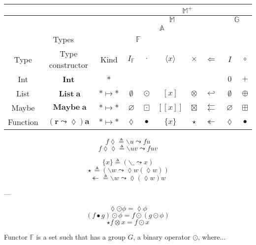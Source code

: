 \documentclass{jsarticle}
\def\[{[\![}
\def\]{]\!]}
\newcommand{\htypename}[1]{\mathbf{#1}}
\newcommand{\htypeclassname}[1]{\mathbb{#1}}
\newcommand{\identity}{I}
\newcommand{\binaryop}{\circ}
\newcommand{\inttypeconst}{\mathbf{Int}}
\newcommand{\listtype}[1]{[#1]}
\newcommand{\maybetype}[1]{\[#1\]}
\newcommand{\functype}[1]{\{#1\}}
\newcommand{\hrightarrow}{\leadsto}
\newcommand{\hlambdaparameter}{\lozenge}
\newcommand{\listtypeconst}[1]{\mathop{\htypename{List}}\htypename{#1}}
\newcommand{\maybetypeconst}[1]{\mathop{\htypename{Maybe}}\htypename{#1}}
\newcommand{\functypeconst}[1]{(\htypename{r}\hrightarrow\hlambdaparameter)\htypename{#1}}
\newcommand{\hfmap}{\cdot}
\newcommand{\hlistfmap}{\odot}
\newcommand{\hmaybefmap}{\boxdot}
\newcommand{\hfuncfmap}{\bullet}
\newcommand{\hemptylist}{\emptyset}
\newcommand{\hnothing}{\varnothing}
\newcommand{\hid}{\hlambdaparameter}
\newcommand{\hlambda}{\backslash}
\newcommand{\hlambdaparameterignore}{\_}
\newcommand{\hpure}[1]{\langle#1\rangle}
\newcommand{\hpurelist}[1]{\listtype{#1}}
\newcommand{\hpuremaybe}[1]{\maybetype{#1}}
\newcommand{\hpurefunc}[1]{\functype{#1}}
\newcommand{\hpurefuncimp}[1]{(\hlambda\hlambdaparameterignore\hrightarrow#1)}
\newcommand{\hafmap}{\times}
\newcommand{\hlistafmap}{\otimes}
\newcommand{\hmaybeafmap}{\boxtimes}
\newcommand{\hfuncafmap}{\star}
\newcommand{\hfuncafmapimp}[1]{(\hlambda#1\hrightarrow\hlambdaparameter#1(\hlambdaparameter#1))}
\newcommand{\hbind}{\Leftarrow}
\newcommand{\hlistbind}{\hookleftarrow}
\newcommand{\hmaybebind}{\leftleftarrows}
\newcommand{\hlistplus}{\oplus}
\newcommand{\hmaybeplus}{\boxplus}
\newcommand{\concretetype}{$\mathbf{*}$}
\newcommand{\functortype}{$\mathbf{*}\mapsto\mathbf{*}$}
\newcommand{\hmfbind}{\twoheadleftarrow}
\newcommand{\hmfbindimp}[1]{\hlambda#1\hrightarrow\hlambdaparameter(\hlambdaparameter#1)#1}
\begin{document}
\begin{center}
\begin{tabular}{||c|c|c||c|c|c|c|c|c|c||}
\hline
\multicolumn{3}{||c||}{ }
    &\multicolumn{7}{|c||}{$\htypeclassname{M}^+$}\\
\hline
\multicolumn{3}{||c||}{ }
    &\multicolumn{5}{|c|}{$\htypeclassname{M}$}
    &\multicolumn{2}{|c||}{$\htypeclassname{G}$}\\
\hline
\multicolumn{3}{||c||}{ }
    &\multicolumn{4}{|c|}{$\htypeclassname{A}$}
    &
    &\multicolumn{2}{|c||}{ }\\
\hline
\multicolumn{3}{||c||}{Types}
    &\multicolumn{2}{|c|}{$\htypeclassname{F}$}
    &\multicolumn{2}{|c|}{ }
    &
    &\multicolumn{2}{|c||}{ }\\
\hline
Type
    &Type constructor
    &Kind
    &$\identity_\htypeclassname{F}$
    &$\hfmap$
    &$\hpure{x}$
    &$\hafmap$
    &$\hbind$
    &$\identity$
    &$\binaryop$\\
\hline\hline
Int
    &$\inttypeconst$
    &\concretetype
    &
    &
    &
    &
    &
    &$0$
    &$+$\\
\hline
List
    &$\listtypeconst{a}$
    &\functortype
    &$\hemptylist$
    &$\hlistfmap$
    &$\hpurelist{x}$
    &$\hlistafmap$
    &$\hlistbind$
    &$\hemptylist$
    &$\hlistplus$\\
\hline
Maybe
    &$\maybetypeconst{a}$
    &\functortype
    &$\hnothing$
    &$\hmaybefmap$
    &$\hpuremaybe{x}$
    &$\hmaybeafmap$
    &$\hmaybebind$
    &$\hnothing$
    &$\hmaybeplus$\\
\hline
Function
    &$\functypeconst{a}$
    &\functortype
    &$\hid$
    &$\hfuncfmap$
    &$\hpurefunc{x}$
    &$\hfuncafmap$
    &$\hmfbind$
    &$\hid$
    &$\hfuncfmap$\\
\hline
\end{tabular}
\end{center}

$$f\hlambdaparameter\triangleq\hlambda u\hrightarrow fu$$
$$f\hlambdaparameter\hlambdaparameter\triangleq\hlambda uv\hrightarrow fuv$$

$$\hpurefunc{x}\triangleq\hpurefuncimp{x}$$
$${}\hfuncafmap{}\triangleq\hfuncafmapimp{w}$$
$${}\hmfbind{}\triangleq\hmfbindimp{w}$$

---

$$\lozenge\odot\phi=\lozenge\phi$$
$$(f\bullet g)\odot\phi=f\odot(g\odot\phi)$$
$$\star f\otimes x=f\odot x$$


Functor $\htypeclassname{F}$ is a set such that has a group $G$, a binary operator $\odot$, where...
\end{document}
